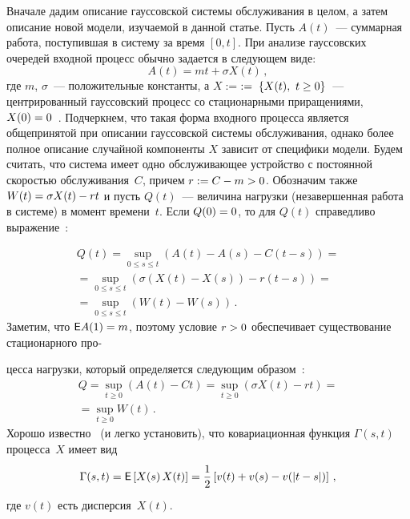 \begin{multicols}{2}
Вначале дадим  описание гауссовской системы обслуживания в целом, а
затем описание новой модели, изучаемой  в данной статье. Пусть
$A(t)$~--- суммарная работа, поступившая в систему за время $[0,t]$.
При анализе  гауссовских очередей  входной процесс обычно
задается в следующем виде:
\begin{equation}
A(t)=mt+\sigma X(t)\,, 
\label{asymp-l1}
\end{equation}
где  $m$, $\sigma $~--- положительные константы, а  $X:=$\linebreak $:=\;\{X(t),\ t\hm\geq 0\}$~---  
центрированный гауссовский процесс со стационарными
приращениями,  $X(0)\hm=0$~\cite{Mandjes}.
 Подчеркнем, что такая форма входного процесса  является
 общепринятой при описании гауссовской системы обслуживания, однако более полное описание случайной компоненты  $X$
 зависит от специфики  модели.  Будем считать, что система имеет одно обслуживающее устройство с постоянной
скоростью обслуживания~$C$, причем $r:=C\hm-m\hm>0$. Обозначим также
$W(t)\hm=\sigma X(t)\hm-rt$ и пусть
 $Q(t)$~--- величина нагрузки (незавершенная работа в системе) в момент времени~$t$. 
 Если $Q(0)\hm=0$, то для $Q(t)$ справедливо выражение~\cite{Reich}:
 
 \noindent
\begin{multline}
Q(t)= \sup\limits_{0 \leq s \leq t}(A(t)-A(s)-C(t-s))={}\\
{}= \sup\limits_{0 \leq s \leq t}(\sigma(X(t)-X(s))-r(t-s))={}\\
{}=\sup\limits_{0 \leq s \leq t}(W(t)-W(s))\,.
\label{e6a-ml}
\end{multline}
Заметим, что $ \e A(1)\hm=m$, поэтому  условие  $r\hm>0$ обеспечивает
существование стационарного про-\linebreak\vspace*{-12pt}

\pagebreak

\noindent
цесса нагрузки,  который определяется
следующим образом~\cite{Mandjes}:
\begin{multline}
Q= \sup\limits_{t \geq 0} \left( A(t)-Ct \right)= \sup\limits_{t \geq 0} \left( \sigma X(t)-rt \right)={}\\
{}= \sup\limits_{t \geq 0} W(t)\,.
\label{e6-ml}
\end{multline}
Хорошо известно~\cite{Mandjes} (и легко установить), что
ковариационная функция $\Gamma(s,t)$ процесса~$X$ имеет вид
\begin{equation*}
\Gamma(s,t)={\sf E}\left [X(s)\,X(t)\right]=\displaystyle\frac{\displaystyle 1\mathstrut}{\displaystyle 2\mathstrut}\left[
v(t)+v(s)-v(|t-s|) \right]\,,
\end{equation*}
где $v(t)$ есть дисперсия~$X(t)$.


\end{multicols}
